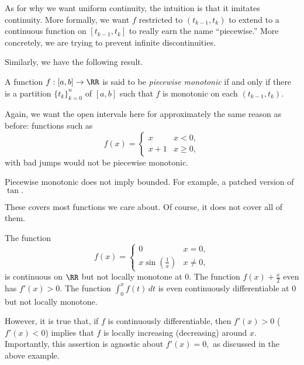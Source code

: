 \documentclass[../notes.tex]{subfiles}
\begin{document}
As for why we want uniform continuity, the intuition is that it imitates continuity. More formally, we want $f$ restricted to $(t_{k-1},t_k)$ to extend to a continuous function on $[t_{k-1},t_k]$ to really earn the name ``piecewise.'' More concretely, we are trying to prevent infinite discontinuities.

Similarly, we have the following result.
\begin{definition}
	A function $f:[a,b]\to\RR$ is said to be \textit{piecewise monotonic} if and only if there is a partition $\{t_k\}_{k=0}^n$ of $[a,b]$ such that $f$ is monotonic on each $(t_{k-1},t_k).$
\end{definition}
Again, we want the open intervals here for approximately the same reason as before: functions such as
\[f(x)=\begin{cases}
	x & x<0, \\
	x+1 & x\ge0,
\end{cases}\]
with bad jumps would not be piecewise monotonic.
\begin{warn}
	Piecewise monotonic does not imply bounded. For example, a patched version of $\tan.$
\end{warn}

These covers most functions we care about. Of course, it does not cover all of them.
\begin{nex}
	The function
	\[f(x)=\begin{cases}
		0 & x=0, \\
		x\sin\left(\frac1x\right) & x\ne0,
	\end{cases}\]
	is continuous on $\RR$ but not locally monotone at $0.$ The function $f(x)+\frac x2$ even has $f'(x)>0.$ The function $\int_0^xf(t)\,dt$ is even continuously differentiable at $0$ but not locally monotone.
\end{nex}
However, it is true that, if $f$ is continuously differentiable, then $f'(x)>0$ ($f'(x)<0$) implies that $f$ is locally increasing (decreasing) around $x.$ Importantly, this assertion is agnostic about $f'(x)=0,$ as discussed in the above example.
\end{document}

